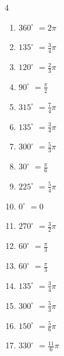 \begin{multicols}{4}
\begin{enumerate}
  \item $\displaystyle 360^{\circ}$
        $\displaystyle =2\pi$

  \item $\displaystyle 135^{\circ}$
        $\displaystyle =\frac{3}{4}\pi$

  \item $\displaystyle 120^{\circ}$
        $\displaystyle =\frac{2}{3}\pi$

  \item $\displaystyle 90^{\circ}$
        $\displaystyle =\frac{\pi}{2}$

  \item $\displaystyle 315^{\circ}$
        $\displaystyle =\frac{7}{4}\pi$

  \item $\displaystyle 135^{\circ}$
        $\displaystyle =\frac{3}{4}\pi$

  \item $\displaystyle 300^{\circ}$
        $\displaystyle =\frac{5}{3}\pi$

  \item $\displaystyle 30^{\circ}$
        $\displaystyle =\frac{\pi}{6}$

\columnbreak %

  \item $\displaystyle 225^{\circ}$
        $\displaystyle =\frac{5}{4}\pi$

  \item $\displaystyle 0^{\circ}$
        $\displaystyle =0$

  \item $\displaystyle 270^{\circ}$
        $\displaystyle =\frac{3}{2}\pi$

  \item $\displaystyle 60^{\circ}$
        $\displaystyle =\frac{\pi}{3}$

  \item $\displaystyle 60^{\circ}$
        $\displaystyle =\frac{\pi}{3}$

  \item $\displaystyle 135^{\circ}$
        $\displaystyle =\frac{3}{4}\pi$

  \item $\displaystyle 300^{\circ}$
        $\displaystyle =\frac{5}{3}\pi$

  \item $\displaystyle 150^{\circ}$
        $\displaystyle =\frac{5}{6}\pi$

  \item $\displaystyle 330^{\circ}$
        $\displaystyle =\frac{11}{6}\pi$


\end{enumerate}
\end{multicols}
